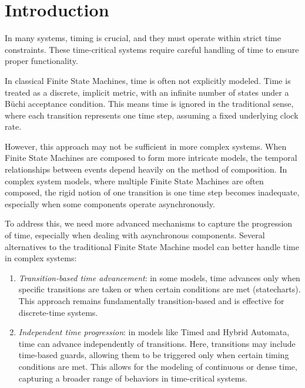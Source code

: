 \section{Introduction}

In many systems, timing is crucial, and they must operate within strict time constraints. 
These time-critical systems require careful handling of time to ensure proper functionality.

In classical Finite State Machines, time is often not explicitly modeled. 
Time is treated as a discrete, implicit metric, with an infinite number of states under a Büchi acceptance condition. 
This means time is ignored in the traditional sense, where each transition represents one time step, assuming a fixed underlying clock rate.

However, this approach may not be sufficient in more complex systems.
When Finite State Machines are composed to form more intricate models, the temporal relationships between events depend heavily on the method of composition. 
In complex system models, where multiple Finite State Machines are often composed, the rigid notion of one transition is one time step becomes inadequate, especially when some components operate asynchronously.

To address this, we need more advanced mechanisms to capture the progression of time, especially when dealing with asynchronous components. 
Several alternatives to the traditional Finite State Machine model can better handle time in complex systems:
\begin{enumerate}
    \item \textit{Transition-based time advancement}: in some models, time advances only when specific transitions are taken or when certain conditions are met (statecharts). 
        This approach remains fundamentally transition-based and is effective for discrete-time systems.
    \item \textit{Independent time progression}: in models like Timed and Hybrid Automata, time can advance independently of transitions. 
        Here, transitions may include time-based guards, allowing them to be triggered only when certain timing conditions are met. 
        This allows for the modeling of continuous or dense time, capturing a broader range of behaviors in time-critical systems.
\end{enumerate}